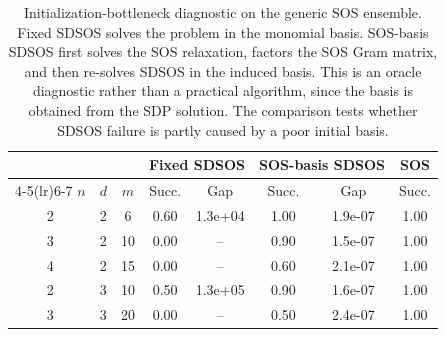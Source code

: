\begin{table}[t]
\centering
\small
\begin{tabular}{ccc cc cc c}
\toprule
& & & \multicolumn{2}{c}{Fixed SDSOS} & \multicolumn{2}{c}{SOS-basis SDSOS} & SOS \\
\cmidrule(lr){4-5}\cmidrule(lr){6-7}
\(n\) & \(d\) & \(m\) & Succ. & Gap & Succ. & Gap & Succ. \\
\midrule
2 & 2 & 6 & 0.60 & 1.3e+04 & 1.00 & 1.9e-07 & 1.00 \\
3 & 2 & 10 & 0.00 & -- & 0.90 & 1.5e-07 & 1.00 \\
4 & 2 & 15 & 0.00 & -- & 0.60 & 2.1e-07 & 1.00 \\
2 & 3 & 10 & 0.50 & 1.3e+05 & 0.90 & 1.6e-07 & 1.00 \\
3 & 3 & 20 & 0.00 & -- & 0.50 & 2.4e-07 & 1.00 \\
\bottomrule
\end{tabular}
\caption{
Initialization-bottleneck diagnostic on the generic SOS ensemble. 
Fixed SDSOS solves the problem in the monomial basis. 
SOS-basis SDSOS first solves the SOS relaxation, factors the SOS Gram matrix, and then re-solves SDSOS in the induced basis. 
This is an oracle diagnostic rather than a practical algorithm, since the basis is obtained from the SDP solution. 
The comparison tests whether SDSOS failure is partly caused by a poor initial basis.
}
\label{tab:initialization-bottleneck}
\end{table}
